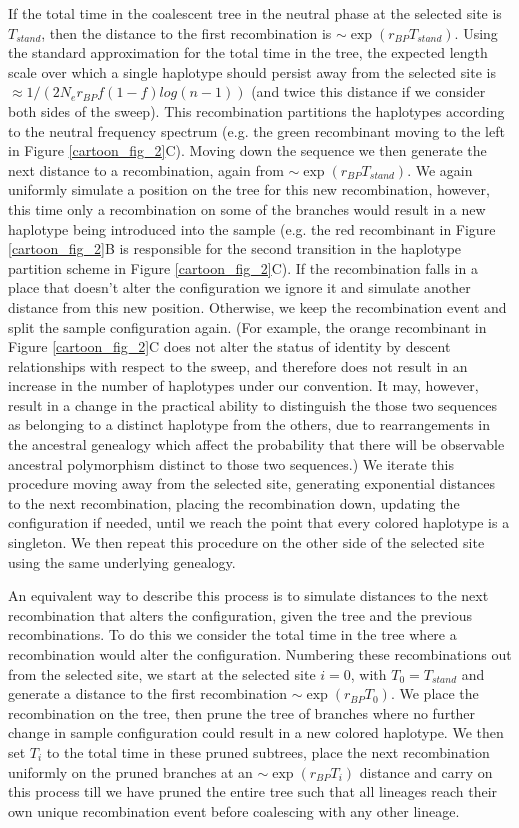 \documentclass[a4paper,10pt]{article}
\begin{document}
If the total time in the coalescent tree in the neutral phase at the selected site is $T_{stand}$, then the distance to the first recombination is $\sim \exp \left( r_{BP} T_{stand} \right)$. Using the standard approximation for the total time in the tree, the expected length scale over which a single haplotype should persist away from the selected site is $\approx 1/( 2 N_e r_{BP}f\left(1-f\right) log(n-1))$ (and twice this distance if we consider both sides of the sweep). This recombination partitions the haplotypes according to the neutral frequency spectrum (e.g. the green recombinant moving to the left in Figure \ref{cartoon_fig_2}C). Moving down the sequence we then generate the next distance to a recombination, again from $\sim \exp \left( r_{BP} T_{stand} \right)$. We again uniformly simulate a position on the tree for this new recombination, however, this time only a recombination on some of the branches would result in a new haplotype being introduced into the sample (e.g. the red recombinant in Figure \ref{cartoon_fig_2}B is responsible for the second transition in the haplotype partition scheme in Figure \ref{cartoon_fig_2}C). If the recombination falls in a place that doesn't alter the configuration we ignore it and simulate another distance from this new position. Otherwise, we keep the recombination event and split the sample configuration again. (For example, the orange recombinant in Figure \ref{cartoon_fig_2}C does not alter the status of identity by descent relationships with respect to the sweep, and therefore does not result in an increase in the number of haplotypes under our convention. It may, however, result in a change in the practical ability to distinguish the those two sequences as belonging to a distinct haplotype from the others, due to rearrangements in the ancestral genealogy which affect the probability that there will be observable ancestral polymorphism distinct to those two sequences.) We iterate this procedure moving away from the selected site, generating exponential distances to the next recombination, placing the recombination down, updating the configuration if needed, until we reach the point that every colored haplotype is a singleton. We then repeat this procedure on the other side of the selected site using the same underlying genealogy.

An equivalent way to describe this process is to simulate distances to the next recombination that alters the configuration, given the tree and the previous recombinations. To do this we consider the total time in the tree where a recombination would alter the configuration. Numbering these recombinations out from the selected site,  we start at the selected site $i=0$, with $T_0 = T_{stand}$ and generate a distance to the first recombination $\sim \exp(r_{BP} T_0)$. We place the recombination on the tree, then prune the tree of branches where no further change in sample configuration could result in a new colored haplotype. We then set $T_i$ to the total time in these pruned subtrees, place the next recombination uniformly on the pruned branches at an $\sim \exp(r_{BP} T_i)$ distance and carry on this process till we have pruned the entire tree such that all lineages reach their own unique recombination event before coalescing with any other lineage.
\end{document}
